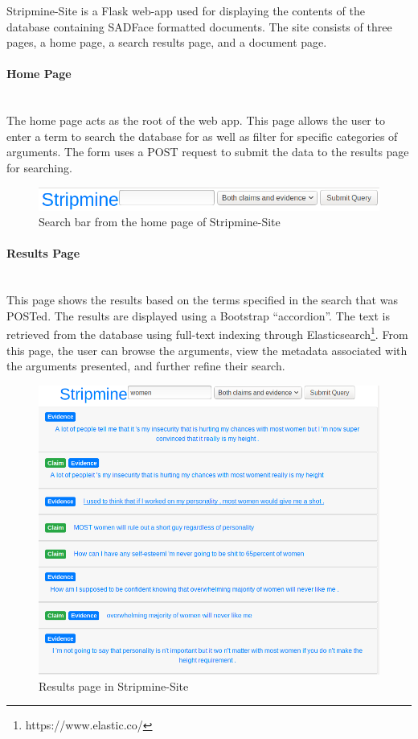 \documentclass[12pt,a4paper]{article}
\begin{document}
Stripmine-Site is a Flask web-app used for displaying the contents of the database containing SADFace formatted documents. The site consists of three pages, a home page, a search results page, and a document page.

\paragraph{Home Page}\mbox{}\\

The home page acts as the root of the web app. This page allows the user to enter a term to search the database for as well as filter for specific categories of arguments. The form uses a POST request to submit the data to the results page for searching.

\begin{figure}[H]
    \centering
    \includegraphics[scale=0.5]{Report/graphics/home.png}
    \caption{Search bar from the home page of Stripmine-Site}
    \label{fig:home}
\end{figure}

\paragraph{Results Page}\mbox{}\\

This page shows the results based on the terms specified in the search that was POSTed. The results are displayed using a Bootstrap ``accordion''. The text is retrieved from the database using full-text indexing through Elasticsearch\footnote{https://www.elastic.co/}. From this page, the user can browse the arguments, view the metadata associated with the arguments presented, and further refine their search.
\newline
\begin{figure}[H]
    \centering
    \includegraphics[scale=0.5]{Report/graphics/results-1.png}
    \caption{Results page in Stripmine-Site}
    \label{fig:results1}
\end{figure}
\end{document}
